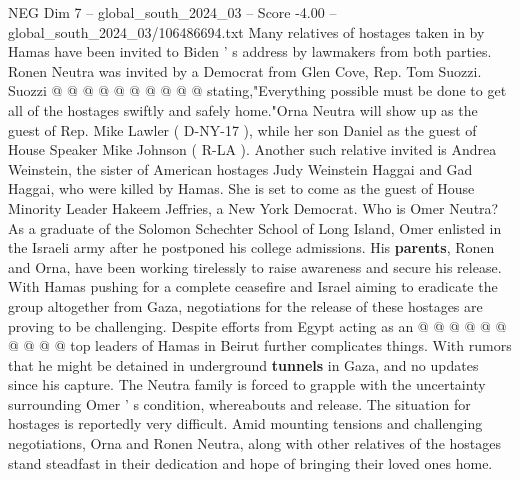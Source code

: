 \begin{textsample}{NEG Dim 7 – global\_south\_2024\_03 – Score -4.00 – global\_south\_2024\_03/106486694.txt}
Many relatives of hostages taken in by Hamas have been invited to Biden ' s address by lawmakers from both parties.
Ronen Neutra was invited by a Democrat from Glen Cove, Rep.
Tom Suozzi.
Suozzi @ @ @ @ @ @ @ @ @ @ stating,"Everything possible must be done to get all of the hostages swiftly and safely home."Orna Neutra will show up as the guest of Rep.
Mike Lawler ( D-NY-17 ), while her son Daniel as the guest of House Speaker Mike Johnson ( R-LA ).
Another such relative invited is Andrea Weinstein, the sister of American hostages Judy Weinstein Haggai and Gad Haggai, who were killed by Hamas.
She is set to come as the guest of House Minority Leader Hakeem Jeffries, a New York Democrat.
Who is Omer Neutra?
As a graduate of the Solomon Schechter School of Long Island, Omer enlisted in the Israeli army after he postponed his college admissions.
His \textbf{parents}, Ronen and Orna, have been working tirelessly to raise awareness and secure his release.
With Hamas pushing for a complete ceasefire and Israel aiming to eradicate the group altogether from Gaza, negotiations for the release of these hostages are proving to be challenging.
Despite efforts from Egypt acting as an @ @ @ @ @ @ @ @ @ @ top leaders of Hamas in Beirut further complicates things.
With rumors that he might be detained in underground \textbf{tunnels} in Gaza, and no updates since his capture.
The Neutra family is forced to grapple with the uncertainty surrounding Omer ' s condition, whereabouts and release.
The situation for hostages is reportedly very difficult.
Amid mounting tensions and challenging negotiations, Orna and Ronen Neutra, along with other relatives of the hostages stand steadfast in their dedication and hope of bringing their loved ones home.

\end{textsample}
